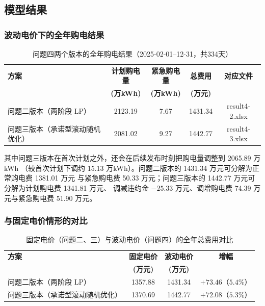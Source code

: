 \documentclass[12pt,a4paper]{article}
\begin{document}
\subsection{模型结果}

\subsubsection{波动电价下的全年购电结果}

\begin{table}[htbp]
\centering
\small
\caption{问题四两个版本的全年购电结果（2025-02-01--12-31，共334天）}
\begin{tabular}{lcccc}
\toprule
\textbf{方案} & \textbf{计划购电量} & \textbf{紧急购电量} & \textbf{总费用} & \textbf{对应文件} \\
              & \textbf{(万kWh)}    & \textbf{(万kWh)}    & \textbf{(万元)} & \\
\midrule
问题二版本（两阶段 LP）    & 2123.19 & 7.67  & 1431.34 & result4-2.xlsx \\
问题三版本（承诺型滚动随机优化） & 2081.02 & 9.27 & 1442.77 & result4-3.xlsx \\
\bottomrule
\end{tabular}
\end{table}

其中问题三版本在首次计划之外，还会在后续发布时刻把购电量调整到 2065.89 万kWh
（较首次计划下调约 15.13 万kWh）。问题二版本的 1431.34 万元可分解为正常购电费 1381.01 万元
与紧急购电费 50.33 万元；问题三版本的 1442.77 万元可分解为计划购电费 1341.81 万元、
调减违约金 $-25.33$ 万元、调增购电费 74.39 万元与紧急购电费 51.90 万元。

\subsubsection{与固定电价情形的对比}

\begin{table}[htbp]
\centering
\small
\caption{固定电价（问题二、三）与波动电价（问题四）的全年总费用对比}
\begin{tabular}{lccc}
\toprule
\textbf{方案} & \textbf{固定电价} & \textbf{波动电价} & \textbf{增幅} \\
              & \textbf{(万元)} & \textbf{(万元)} & \\
\midrule
问题二版本（两阶段 LP）    & 1357.88 & 1431.34 & $+73.46$（$5.4\%$） \\
问题三版本（承诺型滚动随机优化） & 1370.69 & 1442.77 & $+72.08$（$5.3\%$） \\
\bottomrule
\end{tabular}
\end{table}
\end{document}
